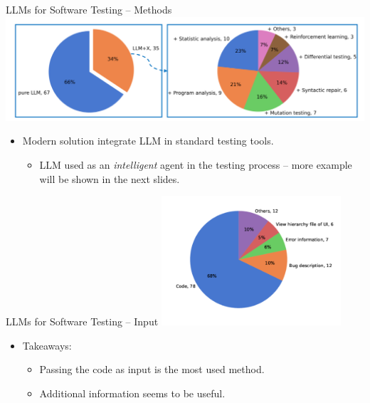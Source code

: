 \documentclass[presentation, 10pt]{beamer}\mode<presentation>{\usetheme{AMSBolognaFC}}
\begin{document}
\begin{frame}{LLMs for Software Testing -- Methods}
\includegraphics[width=\textwidth]{img/llm-usage.png}
\begin{itemize}
	\item Modern solution integrate LLM in standard testing tools.
	\begin{itemize}
		\item LLM used as an \emph{intelligent} agent in the testing process -- more example will be shown in the next slides.
	\end{itemize}
\end{itemize}
\end{frame}
\begin{frame}{LLMs for Software Testing -- Input}
\centering
\includegraphics[width=0.5\textwidth]{img/input-llm.png}
\begin{itemize}
	\item Takeaways:
	\begin{itemize}
		\item Passing the code as input is the most used method.
		\item Additional information seems to be useful.
	\end{itemize}
\end{itemize}
\end{frame}
\end{document}
